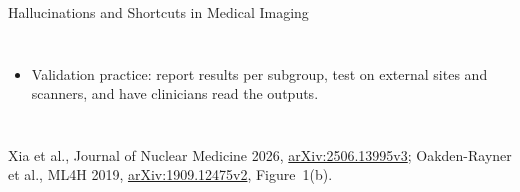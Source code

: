 \begin{frame}{Hallucinations and Shortcuts in Medical Imaging}
\begin{columns}[T,onlytextwidth]
\begin{itemize}
        \item Validation practice: report results per subgroup, test on external sites and scanners, and have clinicians read the outputs.
      \end{itemize}
  \end{columns}
  {\scriptsize Xia et al., Journal of Nuclear Medicine 2026, \href{https://arxiv.org/abs/2506.13995v3}{arXiv:2506.13995v3}; Oakden-Rayner et al., ML4H 2019, \href{https://arxiv.org/abs/1909.12475v2}{arXiv:1909.12475v2}, Figure~1(b).\par}
\end{frame}
